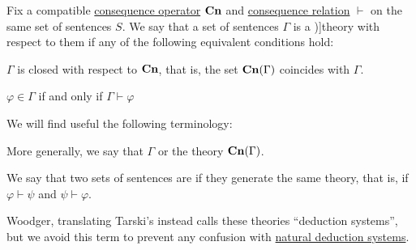 \begin{definition}\label{def:logical_theory}
  Fix a compatible \hyperref[def:consequence_operator]{consequence operator} \( \op*{Cn} \) and \hyperref[def:consequence_relation]{consequence relation} \( {\vdash} \) on the same set of sentences \( S \). We say that a set of sentences \( \Gamma \) is a \term[ru=теория (\cite[3.1.1]{Герасимов2011Вычислимость})]{theory} with respect to them if any of the following equivalent conditions hold:
  \begin{thmenum}[series=def:logical_theory]
     \( \Gamma \) is closed with respect to \( \op*{Cn} \), that is, the set \( \op*{Cn}(\Gamma) \) coincides with \( \Gamma \).

     \( \varphi \in \Gamma \) if and only if \( \Gamma \vdash \varphi \)
  \end{thmenum}

  We will find useful the following terminology:
  \begin{thmenum}[resume=def:logical_theory]
     More generally, we say that \( \Gamma \)  or  the theory \( \op*{Cn}(\Gamma) \).

     We say that two sets of sentences are  if they generate the same theory, that is, if \( \varphi \vdash \psi \) and \( \psi \vdash \varphi \).
  \end{thmenum}
\end{definition}
\begin{comments}
  \item Woodger, translating Tarski's \cite[70]{Tarski1983MethodologyOfDeductiveSciences} instead calls these theories \enquote{deduction systems}, but we avoid this term to prevent any confusion with \hyperref[def:propositional_natural_deduction_systems]{natural deduction systems}.
\end{comments}

